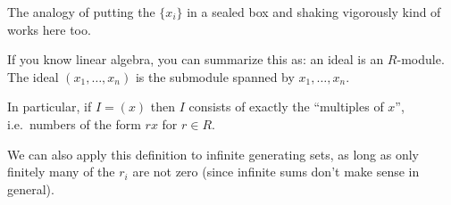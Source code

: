 The analogy of putting the $\{x_i\}$ in a sealed box and shaking vigorously
kind of works here too.
\begin{remark}
	If you know linear algebra,
	you can summarize this as: an ideal is an $R$-module.
	The ideal $(x_1, \dots, x_n)$ is the submodule spanned by $x_1, \dots, x_n$.
\end{remark}

In particular, if $I = (x)$ then $I$ consists of exactly the
``multiples of $x$'', i.e.\ numbers of the form $rx$ for $r \in R$.
\begin{remark}
	We can also apply this definition to infinite generating sets,
	as long as only finitely many of the $r_i$ are not zero
	(since infinite sums don't make sense in general).
\end{remark}

